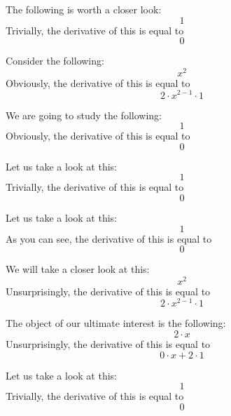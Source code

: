 \documentclass{article}
\begin{document}
The following is worth a closer look:
\begin{equation}
1 
\end{equation}
Trivially, the derivative of this is equal to
\begin{equation}
0 
\end{equation}

Consider the following:
\begin{equation}
x ^{2 } 
\end{equation}
Obviously, the derivative of this is equal to
\begin{equation}
2 \cdot x ^{2 - 1 } \cdot 1 
\end{equation}

We are going to study the following:
\begin{equation}
1 
\end{equation}
Obviously, the derivative of this is equal to
\begin{equation}
0 
\end{equation}

Let us take a look at this:
\begin{equation}
1 
\end{equation}
Trivially, the derivative of this is equal to
\begin{equation}
0 
\end{equation}

Let us take a look at this:
\begin{equation}
1 
\end{equation}
As you can see, the derivative of this is equal to
\begin{equation}
0 
\end{equation}

We will take a closer look at this:
\begin{equation}
x ^{2 } 
\end{equation}
Unsurprisingly, the derivative of this is equal to
\begin{equation}
2 \cdot x ^{2 - 1 } \cdot 1 
\end{equation}

The object of our ultimate interest is the following:
\begin{equation}
2 \cdot x 
\end{equation}
Unsurprisingly, the derivative of this is equal to
\begin{equation}
0 \cdot x + 2 \cdot 1 
\end{equation}

Let us take a look at this:
\begin{equation}
1 
\end{equation}
Trivially, the derivative of this is equal to
\begin{equation}
0 
\end{equation}
\end{document}

